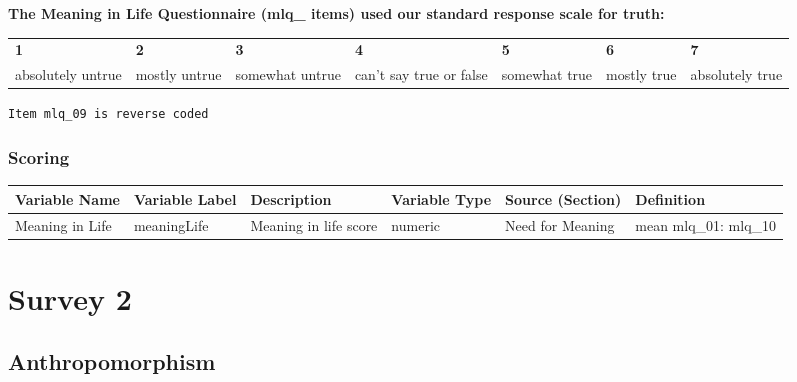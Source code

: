 \documentclass[
  letterpaper,
]{scrbook}
\begin{document}
\textbf{The Meaning in Life Questionnaire (mlq\_ items) used our
standard response scale for truth:}

\begin{longtable}[]{@{}
  >{\raggedright\arraybackslash}p{}
  >{\raggedright\arraybackslash}p{}
  >{\raggedright\arraybackslash}p{}
  >{\raggedright\arraybackslash}p{}
  >{\raggedright\arraybackslash}p{}
  >{\raggedright\arraybackslash}p{}
  >{\raggedright\arraybackslash}p{}@{}}
\toprule\noalign{}
\endhead
\bottomrule\noalign{}
\endlastfoot
\textbf{1} & \textbf{2} & \textbf{3} & \textbf{4} & \textbf{5} &
\textbf{6} & \textbf{7} \\
absolutely untrue & mostly untrue & somewhat untrue & can't say true or
false & somewhat true & mostly true & absolutely true \\
\end{longtable}

\texttt{Item\ mlq\_09\ is\ reverse\ coded}

\section{Scoring}\label{scoring-8}

\begin{tabu} to 
\toprule
Variable Name & Variable Label & Description & Variable Type & Source (Section) & Definition\\
\midrule
Meaning in Life & meaningLife & Meaning in life score & numeric & Need for Meaning & mean mlq\_01: mlq\_10\\
\bottomrule
\end{tabu}

\part{Survey 2}

\chapter{Anthropomorphism}\label{anthropomorphism}
\end{document}
